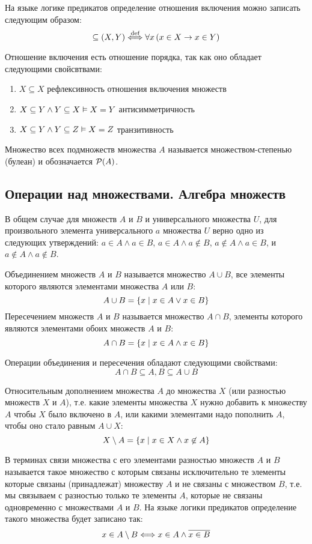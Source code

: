 \documentclass[letterpaper, 10pt]{article}
\theoremstyle{definition}
\begin{document}
На языке логике предикатов определение отношения включения можно записать
следующим образом:
\[
	\subseteq (X,Y) \stackrel{\text{def}}{\Longleftrightarrow} \forall x\, (x\in X \rightarrow x
	\in Y)
\]

Отношение включения есть отношение порядка, так как оно обладает следующими
свойсвтвами:
\begin{enumerate}
	\item $X \subseteq X$ рефлексивность отношения включения множеств
	\item $X \subseteq Y \land Y \subseteq X \vDash X = Y$ антисимметричность
	\item $X \subseteq Y \land Y \subseteq Z \vDash X = Z$ транзитивность
\end{enumerate}

Множество всех подмножеств множества $A$ называется множеством-степенью (булеан) и
обозначается $\mathcal{P}(A)$.

\subsection{Операции над множествами. Алгебра множеств}

В общем случае для множеств $A$ и $B$ и универсального множества $U$, для
произвольного элемента универсального $a$ множества $U$ верно одно из следующих
утверждений: $a \in A \land a \in B$, $a \in A \land a \not\in B$, $a \not\in A
\land a \in B$, и $a \not\in A \land a \not\in B$.

Объединением множеств $A$ и $B$ называется множество $A \cup B$, все элементы
которого являются элементами множества $A$ или $B$:
$$
A \cup B = \left\{x \mid x \in A \lor x \in B\right\}
$$
Пересечением множеств $A$ и $B$ называется множество $A \cap B$, элементы
которого являются элементами обоих множеств $A$ и $B$:
$$
A \cap B = \left\{x \mid x \in A \land x \in B\right\}
$$

Операции объединения и пересечения обладают следующими свойствами:
$$
A \cap B \subseteq A,B \subseteq A \cup B
$$

Относительным дополнением множества $A$ до множества $X$ (или разностью множеств
$X$ и $A$), т.е. какие элементы множества $X$ нужно добавить к множеству $A$
чтобы $X$ было включено в $A$, или какими элементами надо пополнить $A$, чтобы
оно стало равным $A \cup X$:
$$
X \setminus A = \left\{x \mid x \in X \land x \not\in A\right\}
$$

В терминах связи множества с его элементами разностью множеств $A$ и $B$
называется такое множество с которым связаны исключительно те элементы которые
связаны (принадлежат) множеству $A$ и не связаны с множеством $B$, т.е. мы
связываем с разностью только те элементы $A$, которые не связаны одновременно с
множествами $A$ и $B$. На языке логики предикатов определение такого множества
будет записано так:
$$
x \in A \setminus B \Longleftrightarrow x \in A \land \overline{x \in B}
$$
\end{document}
